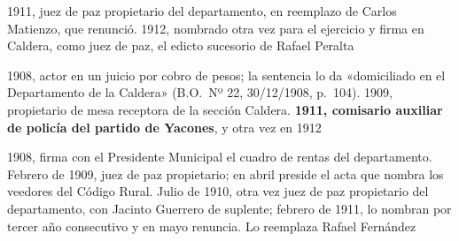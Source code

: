 \begin{personas}
\item[{\textbf{Rafael Fernández\index{Fernández, Rafael}}}] 1911, juez de paz propietario del departamento, en reemplazo de Carlos Matienzo, que renunció. 1912, nombrado otra vez para el ejercicio y firma en Caldera, como juez de paz, el edicto sucesorio de Rafael Peralta

\item[{\textbf{Juan Chuchuy\index{Chuchuy, Juan}}}] 1908, actor en un juicio por cobro de pesos; la sentencia lo da «domiciliado en el Departamento de la Caldera» (B.O.\ Nº 22, 30/12/1908, p.\ 104). 1909, propietario de mesa receptora de la sección Caldera. \textbf{1911, comisario auxiliar de policía del partido de Yacones}, y otra vez en 1912

\item[{\textbf{Carlos Matienzo\index{Matienzo, Carlos}}}] 1908, firma con el Presidente Municipal el cuadro de rentas del departamento. Febrero de 1909, juez de paz propietario; en abril preside el acta que nombra los veedores del Código Rural. Julio de 1910, otra vez juez de paz propietario del departamento, con Jacinto Guerrero de suplente; febrero de 1911, lo nombran por tercer año consecutivo y en mayo renuncia. Lo reemplaza Rafael Fernández


\end{personas}
